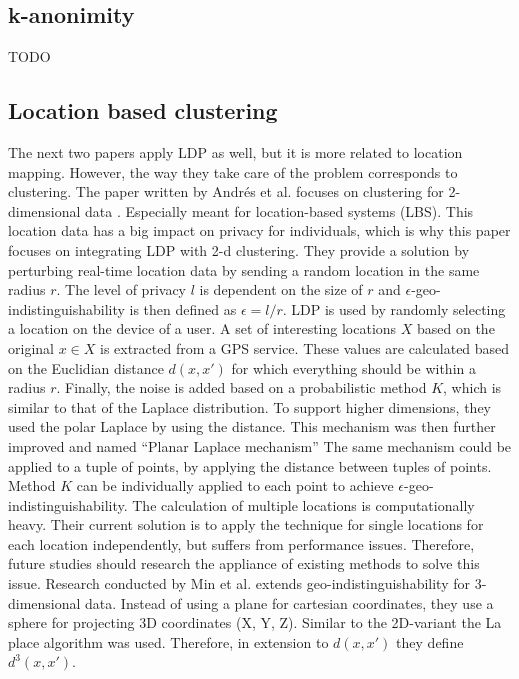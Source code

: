 \subsection*{k-anonimity}
TODO
\subsection*{Location based clustering}
The next two papers apply LDP as well, but it is more related to location mapping. However, the way they take care of the problem corresponds to clustering.
The paper written by Andrés et al. focuses on clustering for 2-dimensional data \cite{DBLP:journals/corr/abs-1212-1984}.
Especially meant for location-based systems (LBS). This location data has a big impact on privacy for individuals, which is why this paper focuses on integrating LDP with 2-d clustering. \newline
They provide a solution by perturbing real-time location data by sending a random location in the same radius $r$.
The level of privacy $l$ is dependent on the size of $r$ and $\epsilon$-geo-indistinguishability is then defined as $\epsilon=l/r$. \newline
LDP is used by randomly selecting a location on the device of a user. A set of interesting locations $X$ based on the original $x \in X$ is extracted from a GPS service.
These values are calculated based on the Euclidian distance $d(x, x')$ for which everything should be within a radius $r$.
Finally, the noise is added based on a probabilistic method $K$, which is similar to that of the Laplace distribution.
To support higher dimensions, they used the polar Laplace by using the distance. This mechanism was then further improved and named “Planar Laplace mechanism” \cite{DBLP:journals/corr/abs-1212-1984} \newline
The same mechanism could be applied to a tuple of points, by applying the distance between tuples of points.
Method $K$ can be individually applied to each point to achieve $\epsilon$-geo-indistinguishability.
The calculation of multiple locations is computationally heavy. Their current solution is to apply the technique for single locations for each location independently, but suffers from performance issues.
Therefore, future studies should research the appliance of existing methods to solve this issue. \newline \newline
Research conducted by Min et al. \cite{9646489} extends geo-indistinguishability for 3-dimensional data.
Instead of using a plane for cartesian coordinates, they use a sphere for projecting 3D coordinates (X, Y, Z).
Similar to the 2D-variant the La place algorithm was used. Therefore, in extension to $d(x, x')$ they define $d^3(x, x')$.



